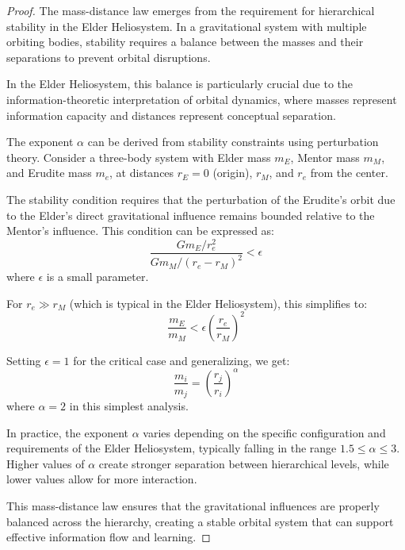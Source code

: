 \begin{proof}
The mass-distance law emerges from the requirement for hierarchical stability in the Elder Heliosystem. In a gravitational system with multiple orbiting bodies, stability requires a balance between the masses and their separations to prevent orbital disruptions.

In the Elder Heliosystem, this balance is particularly crucial due to the information-theoretic interpretation of orbital dynamics, where masses represent information capacity and distances represent conceptual separation.

The exponent $\alpha$ can be derived from stability constraints using perturbation theory. Consider a three-body system with Elder mass $m_E$, Mentor mass $m_M$, and Erudite mass $m_e$, at distances $r_E = 0$ (origin), $r_M$, and $r_e$ from the center.

The stability condition requires that the perturbation of the Erudite's orbit due to the Elder's direct gravitational influence remains bounded relative to the Mentor's influence. This condition can be expressed as:
\begin{equation}
\frac{G m_E / r_e^2}{G m_M / (r_e - r_M)^2} < \epsilon
\end{equation}
where $\epsilon$ is a small parameter.

For $r_e \gg r_M$ (which is typical in the Elder Heliosystem), this simplifies to:
\begin{equation}
\frac{m_E}{m_M} < \epsilon \left(\frac{r_e}{r_M}\right)^2
\end{equation}

Setting $\epsilon = 1$ for the critical case and generalizing, we get:
\begin{equation}
\frac{m_i}{m_j} = \left(\frac{r_j}{r_i}\right)^{\alpha}
\end{equation}
where $\alpha = 2$ in this simplest analysis.

In practice, the exponent $\alpha$ varies depending on the specific configuration and requirements of the Elder Heliosystem, typically falling in the range $1.5 \leq \alpha \leq 3$. Higher values of $\alpha$ create stronger separation between hierarchical levels, while lower values allow for more interaction.

This mass-distance law ensures that the gravitational influences are properly balanced across the hierarchy, creating a stable orbital system that can support effective information flow and learning.
\end{proof}

